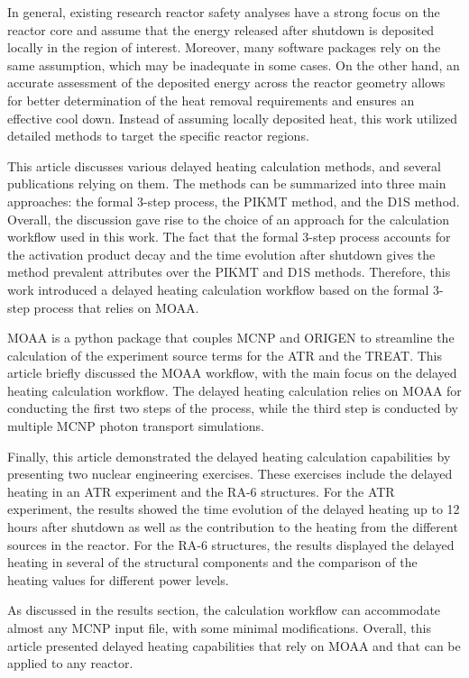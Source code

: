 \documentclass{style/nseJournal}
\begin{document}
In general, existing research reactor safety analyses have a strong focus on the reactor core and assume that the energy released after shutdown is deposited locally in the region of interest.
Moreover, many software packages rely on the same assumption, which may be inadequate in some cases.
On the other hand, an accurate assessment of the deposited energy across the reactor geometry allows for better determination of the heat removal requirements and ensures an effective cool down.
Instead of assuming locally deposited heat, this work utilized detailed methods to target the specific reactor regions.

This article discusses various delayed heating calculation methods, and several publications relying on them.
The methods can be summarized into three main approaches: the formal 3-step process, the PIKMT method, and the D1S method.
Overall, the discussion gave rise to the choice of an approach for the calculation workflow used in this work.
The fact that the formal 3-step process accounts for the activation product decay and the time evolution after shutdown gives the method prevalent attributes over the PIKMT and D1S methods.
Therefore, this work introduced a delayed heating calculation workflow based on the formal 3-step process that relies on MOAA.

MOAA is a python package that couples MCNP and ORIGEN to streamline the calculation of the experiment source terms for the \gls*{ATR} and the \gls*{TREAT}.
This article briefly discussed the MOAA workflow, with the main focus on the delayed heating calculation workflow.
The delayed heating calculation relies on MOAA for conducting the first two steps of the process, while the third step is conducted by multiple MCNP photon transport simulations.

Finally, this article demonstrated the delayed heating calculation capabilities by presenting two nuclear engineering exercises.
These exercises include the delayed heating in an ATR experiment and the RA-6 structures.
For the ATR experiment, the results showed the time evolution of the delayed heating up to 12 hours after shutdown as well as the contribution to the heating from the different sources in the reactor.
For the RA-6 structures, the results displayed the delayed heating in several of the structural components and the comparison of the heating values for different power levels.

As discussed in the results section, the calculation workflow can accommodate almost any MCNP input file, with some minimal modifications.
Overall, this article presented delayed heating capabilities that rely on MOAA and that can be applied to any reactor.
\end{document}
